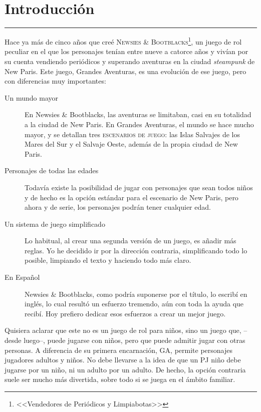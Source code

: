 \chapter{Introducción}

\rule[0]{\textwidth}{1pc}

\vspace{1pc}


Hace ya más de cinco años que creé \textsc{Newsies \& Bootblacks}\footnote{<<Vendedores de Periódicos y Limpiabotas>>}, un juego de rol peculiar en el que los personajes tenían entre nueve a catorce años y vivían por su cuenta vendiendo periódicos y superando aventuras en la ciudad \emph{steampunk} de New Paris. Este juego, Grandes Aventuras, es una evolución de ese juego, pero con diferencias muy importantes:

\begin{description}
\item[Un mundo mayor] En Newsies \& Bootblacks, las aventuras se limitaban, casi en su totalidad a la ciudad de New Paris. En Grandes Aventuras, el mundo se hace mucho mayor, y se detallan tres \textsc{escenarios de juego}: las Islas Salvajes de los Mares del Sur y el Salvaje Oeste, además de la propia ciudad de New Paris.
\item[Personajes de todas las edades] Todavía existe la posibilidad de jugar con personajes que sean todos niños y de hecho es la opción estándar para el escenario de New Paris, pero ahora y de serie, los personajes podrán tener cualquier edad.
\item[Un sistema de juego simplificado] Lo habitual, al crear una segunda versión de un juego, es añadir más reglas. Yo he decidido ir por la dirección contraria, simplificando todo lo posible, limpiando el texto y haciendo todo más claro. 
\item[En Español] Newsies \& Bootblacks, como podría suponerse por el título, lo escribí en inglés, lo cual resultó un esfuerzo tremendo, aún con toda la ayuda que recibí. Hoy prefiero dedicar esos esfuerzos a crear un mejor juego.
\end{description}

Quisiera aclarar que este no es un juego de rol para niños, sino un juego que, --desde luego--, puede jugarse con niños, pero que puede admitir jugar con otras personas. A diferencia de su primera encarnación, GA, permite personajes jugadores adultos y niños. No debe llevarse a la idea de que un PJ niño debe jugarse por un niño, ni un adulto por un adulto. De hecho, la opción contraria suele ser mucho más divertida, sobre todo si se juega en el ámbito familiar.

